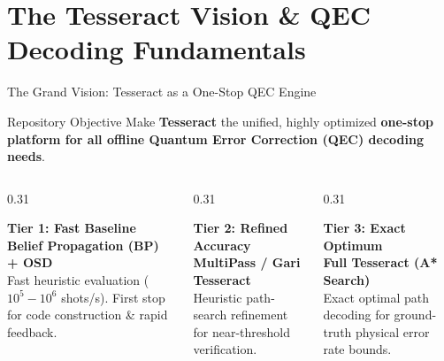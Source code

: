 \section{The Tesseract Vision \& QEC Decoding Fundamentals}

\begin{frame}{The Grand Vision: Tesseract as a One-Stop QEC Engine}
    \begin{block}{Repository Objective}
        Make \textbf{Tesseract} the unified, highly optimized \textbf{one-stop platform for all offline Quantum Error Correction (QEC) decoding needs}.
    \end{block}
    
    \vspace{0.3cm}
    \begin{columns}[T]
        \begin{column}{0.31\textwidth}
            \centering
            \colorbox{googleblue!15}{\parbox{0.92\textwidth}{
                \textbf{\textcolor{googleblue}{Tier 1: Fast Baseline}}\\[0.1cm]
                \textbf{Belief Propagation (BP) + OSD}\\[0.1cm]
                \scriptsize Fast heuristic evaluation ($10^5-10^6$ shots/s). First stop for code construction \& rapid feedback.
            }}
        \end{column}
        
        \begin{column}{0.31\textwidth}
            \centering
            \colorbox{googleyellow!20}{\parbox{0.92\textwidth}{
                \textbf{\textcolor{darknavy}{Tier 2: Refined Accuracy}}\\[0.1cm]
                \textbf{MultiPass / Gari Tesseract}\\[0.1cm]
                \scriptsize Heuristic path-search refinement for near-threshold verification.
            }}
        \end{column}
        
        \begin{column}{0.31\textwidth}
            \centering
            \colorbox{googlegreen!15}{\parbox{0.92\textwidth}{
                \textbf{\textcolor{googlegreen}{Tier 3: Exact Optimum}}\\[0.1cm]
                \textbf{Full Tesseract (A* Search)}\\[0.1cm]
                \scriptsize Exact optimal path decoding for ground-truth physical error rate bounds.
            }}
        \end{column}
    \end{columns}
\end{frame}

